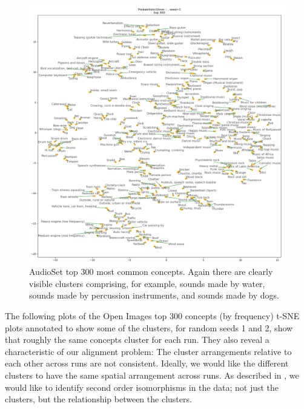 \begin{figure}[H]
    \centering
    \includegraphics[width=\textwidth]{images/method/probabilistic_independent/top300_tsne_audioset__ProbabilisticGlove_1.png}
    \caption{
        AudioSet top 300 most common concepts. Again there are clearly visible clusters comprising, for example, sounds made by water, sounds made by percussion instruments, and sounds made by dogs. 
    }
\end{figure}


The following plots of the Open Images top 300 concepts (by frequency) t-SNE plots annotated to show some of the clusters, for random seeds 1 and 2, show that roughly the same concepts cluster for each run. They also reveal a characteristic of our alignment problem: The cluster arrangements relative to each other across runs are not consistent. Ideally, we would like the different clusters to have the same spatial arrangement across runs. As described in \cite{SHEPARD19701}, we would like to identify second order isomorphisms in the data; not just the clusters, but the relationship between the clusters. 

